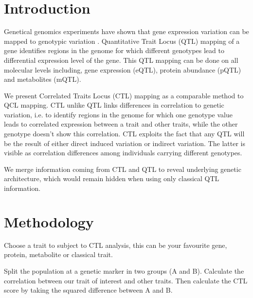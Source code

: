 \documentclass{bioinfo}
\begin{document}
\section{Introduction}
  Genetical genomics experiments have shown that gene expression variation can be mapped to 
  genotypic variation \cite{Jansen:2001}. Quantitative Trait Locus (QTL) mapping of a 
  gene identifies regions in the genome for which different genotypes lead to differential 
  expression level of the gene. This QTL mapping can be done on all molecular levels including, 
  gene expression (eQTL), protein abundance (pQTL) and metabolites (mQTL).
  
  We present Correlated Traits Locus (CTL) mapping as a comparable method to QCL mapping.
  CTL unlike QTL links differences in correlation to genetic variation, i.e. to identify regions in the 
  genome for which one genotype value leads to correlated expression between a trait and  
  other traits, while the other genotype doesn't show this correlation. CTL exploits the fact that 
  any QTL will be the result of either direct induced variation or indirect variation. The latter is 
  visible as correlation differences among individuals carrying different genotypes.
  
  We merge information coming from CTL and QTL to reveal underlying genetic architecture, which 
  would remain hidden when using only classical QTL information.

\section{Methodology}
  Choose a trait to subject to CTL analysis, this can be your favourite gene, 
  protein, metabolite or classical trait.

  Split the population at a genetic marker in two groups (A and B). Calculate the correlation 
  between our trait of interest and other traits. Then calculate the CTL score by taking the 
  squared difference between A and B.
\end{document}
